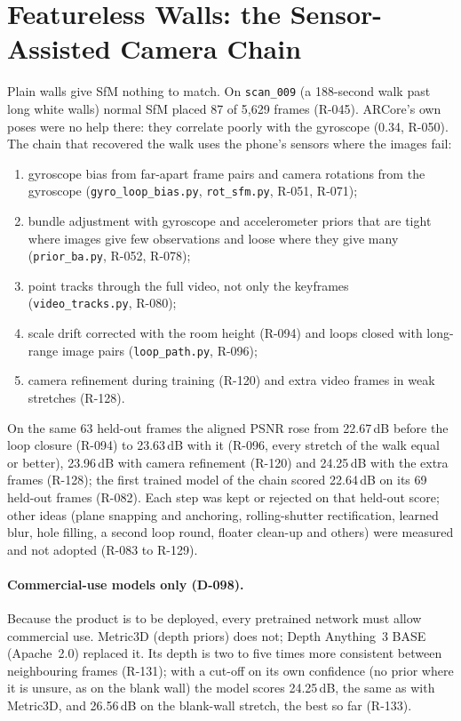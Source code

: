\section{Featureless Walls: the Sensor-Assisted Camera Chain}
\label{sec:featureless}
Plain walls give SfM nothing to match. On \texttt{scan\_009} (a 188-second walk past long white walls) normal SfM
placed 87 of 5{,}629 frames (R-045). ARCore's own poses were no help there: they correlate poorly with the gyroscope
(0.34, R-050). The chain that recovered the walk uses the phone's sensors where the images fail:
\begin{enumerate}
    \item gyroscope bias from far-apart frame pairs and camera rotations from the gyroscope (\texttt{gyro\_loop\_bias.py},
          \texttt{rot\_sfm.py}, R-051, R-071);
    \item bundle adjustment with gyroscope and accelerometer priors that are tight where images give few observations and
          loose where they give many (\texttt{prior\_ba.py}, R-052, R-078);
    \item point tracks through the full video, not only the keyframes (\texttt{video\_tracks.py}, R-080);
    \item scale drift corrected with the room height (R-094) and loops closed with long-range image pairs
          (\texttt{loop\_path.py}, R-096);
    \item camera refinement during training (R-120) and extra video frames in weak stretches (R-128).
\end{enumerate}
On the same 63 held-out frames the aligned PSNR rose from 22.67\,dB before the loop closure (R-094) to 23.63\,dB with
it (R-096, every stretch of the walk equal or better), 23.96\,dB with camera refinement (R-120) and 24.25\,dB with the
extra frames (R-128); the first trained model of the chain scored 22.64\,dB on its 69 held-out frames (R-082). Each
step was kept or rejected on that held-out score; other ideas (plane snapping and anchoring, rolling-shutter
rectification, learned blur, hole filling, a second loop round, floater clean-up and others) were measured and not
adopted (R-083 to R-129).

\paragraph{Commercial-use models only (D-098).} Because the product is to be deployed, every pretrained network must allow
commercial use. Metric3D (depth priors) does not; Depth Anything~3 BASE (Apache~2.0) replaced it. Its depth is two to
five times more consistent between neighbouring frames (R-131); with a cut-off on its own confidence (no prior where
it is unsure, as on the blank wall) the model scores 24.25\,dB, the same as with Metric3D, and 26.56\,dB on the blank-wall
stretch, the best so far (R-133).


